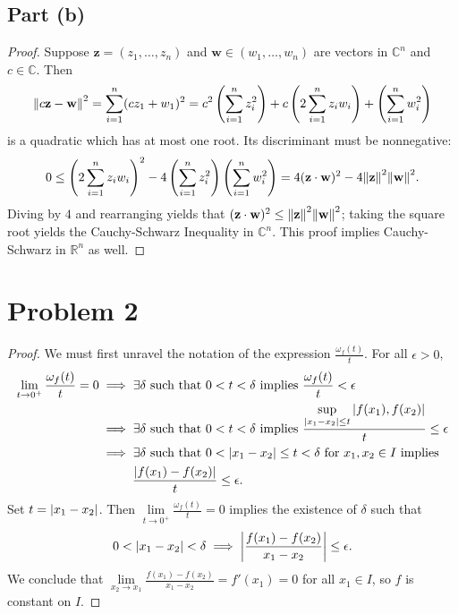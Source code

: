 \documentclass[11pt]{article}
\renewcommand{\vec}[1]{\mathbf{#1}}
\begin{document}
\newpage


\subsection{Part (b)}

\begin{proof}
 Suppose $\vec{z} = (z_{1}, \ldots, z_{n})$ and $\vec{w} \in (w_{1}, \ldots, w_{n})$ are vectors in $\mathbb{C}^{n}$ and $c \in \mathbb{C}$. Then 
  \[
    \norm{c\vec{z} - \vec{w}}^{2} = \sum\limits_{i = 1}^{n} (c z_{1} + w_{1})^{2} = c^{2} \left( \sum\limits_{i = 1}^{n} z_{i}^{2} \right) + c \left( 2 \sum\limits_{i = 1}^{n} z_{i}w_{i} \right) + \left( \sum\limits_{i = 1}^{n} w_{i}^{2} \right)
  \]
  is a quadratic which has at most one root. Its discriminant must be nonnegative:
  \[
    0 \le \left( 2 \sum\limits_{i = 1}^{n} z_{i}w_{i} \right)^{2} - 4 \left( \sum\limits_{i = 1}^{n} z_{i}^{2} \right) \left( \sum\limits_{i = 1}^{n} w_{i}^{2} \right) = 4 (\vec{z} \cdot \vec{w})^{2} - 4 \norm{\vec{z}}^{2} \norm{\vec{w}}^{2}.
  \]
  Diving by $4$ and rearranging yields that $(\vec{z} \cdot \vec{w})^{2} \le \norm{\vec{z}}^{2} \norm{\vec{w}}^{2}$; taking the square root yields the Cauchy-Schwarz Inequality in $\mathbb{C}^{n}$. This proof implies Cauchy-Schwarz in $\mathbb{R}^{n}$ as well.
\end{proof}


\section{Problem 2}

\begin{proof}
  We must first unravel the notation of the expression $\tfrac{\omega_{f}(t)}{t}$. For all $\epsilon > 0$,
  \begin{align*}
    \lim\limits_{t \to 0^{+}} \frac{\omega_{f}(t)}{t} = 0 &\implies \exists \delta \text{ such that } 0 < t < \delta \text{ implies } \frac{\omega_{f}(t)}{t} < \epsilon \\
    &\implies \exists \delta \text{ such that } 0 < t < \delta \text{ implies } \frac{\sup\limits_{\abs{x_{1} - x_{2}} \le t} \abs{f(x_{1}), f(x_{2})}}{t} \le \epsilon \\
    &\implies \exists \delta \text{ such that } 0 < \abs{x_{1} - x_{2}} \le t < \delta \text{ for } x_{1}, x_{2} \in I \text{ implies } \\
    & \, \, \, \, \qquad \frac{\abs{f(x_{1}) - f(x_{2})}}{t} \le \epsilon. 
  \end{align*}
  Set $t = \abs{x_{1} - x_{2}}$. Then $\lim\limits_{t \to 0^{+}} \frac{\omega_{f}(t)}{t} = 0$ implies the existence of $\delta$ such that
  \[
    0 < \abs{x_{1} - x_{2}} < \delta \implies \abs{\frac{f(x_{1}) - f(x_{2})}{x_{1} - x_{2}}} \le \epsilon.
  \]
  We conclude that $\lim\limits_{x_{2} \to x_{1}} \frac{f(x_{1}) - f(x_{2})}{x_{1} - x_{2}} = f'(x_{1}) = 0$ for all $x_{1} \in I$, so $f$ is constant on $I$.
\end{proof}
\end{document}
